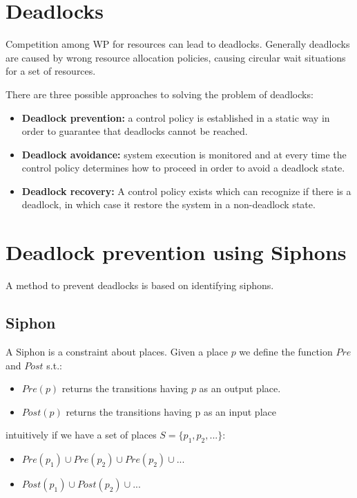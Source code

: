 \section{Deadlocks}
Competition among WP for resources can lead to deadlocks. Generally deadlocks are caused by wrong resource allocation policies, causing circular wait situations for a set of resources. \par
There are three possible approaches to solving the problem of deadlocks:
\begin{itemize}
    \item \textbf{Deadlock prevention:} a control policy is established in a static way in order to guarantee that deadlocks cannot be reached.
    \item \textbf{Deadlock avoidance:} system execution is monitored and at every time the control policy determines how to proceed in order to avoid a deadlock state.
    \item \textbf{Deadlock recovery:} A control policy exists which can recognize if there is a deadlock, in which case it restore the system in a non-deadlock state.
\end{itemize}

\section{Deadlock prevention using Siphons}
A method to prevent deadlocks is based on identifying siphons.

\subsection{Siphon}
A Siphon is a constraint about places. Given a place $p$ we define the function $Pre$ and $Post$ s.t.:
\begin{itemize}
    \item $Pre(p)$ returns the transitions having $p$ as an output place.
    \item $Post(p)$ returns the transitions having p as an input place
\end{itemize}

intuitively if we have a set of places $S = \{p_{1}, p_{2}, ...\}$:
\begin{itemize}
    \item $Pre(p_{1}) \cup Pre(p_{2}) \cup Pre(p_{2}) \cup ...$ 
    \item $Post(p_{1}) \cup Post(p_{2}) \cup ...$ 
\end{itemize}


